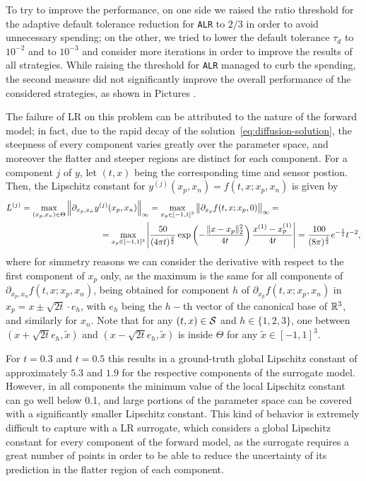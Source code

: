 To try to improve the performance, on one side we raised the ratio threshold for the adaptive default tolerance reduction for \texttt{ALR} to $2/3$ in order to avoid unnecessary spending; on the other, we tried to lower the default tolerance $\tau_d$ to $10^{-2}$ and to $10^{-3}$ and consider more iterations in order to improve the results of all strategies.
While raising the threshold for \texttt{ALR} managed to curb the spending, the second measure did not significantly improve the overall performance of the considered strategies, as shown in Pictures .

The failure of LR on this problem can be attributed to the nature of the forward model; in fact, due to the rapid decay of the solution~\eqref{eq:diffusion-solution}, the steepness of every component varies greatly over the parameter space, and moreover the flatter and steeper regions are distinct for each component.
For a component $j$ of $y$, let $(t,x)$ being the corresponding time and sensor postion.
Then, the Lipschitz constant for $y^{(j)}(x_p,x_n) = f(t,x;x_p,x_n)$ is given by 
\begin{align*}
    L^{(j)} = \max_{(x_p,x_n)\in\Theta}& \left\| \partial_{x_p,  x_n} y^{(j)}(x_p,x_n) \right\|_\infty  =
    \max_{x_p\in[-1,1]^3} \left\| \partial_{x_p} f(t,x;x_p,0) \right\|_\infty  =\\
    &\qquad \qquad= \max_{x_p\in [-1,1]^3} \left| \frac{50}{(4 \pi t)^{\frac{3}{2}}}\exp \left( - \frac{\lVert x-x_p\rVert_2^2}{4t}\right) \frac{x^{(1)}-x_p^{(1)}}{4t} \right| 
    = \frac{100}{(8\pi)^{\frac{3}{2}}} e^{-\frac{1}{2}} t^{-2},
\end{align*}
where for simmetry reasons we can consider the derivative with respect to the first component of $x_p$ only, as the maximum is the same for all components of $\partial_{x_p, x_n} f(t,x;x_p,x_n)$, being obtained for component $h$ of $\partial_{x_p} f(t,x;x_p,x_n)$ in $x_p = x \pm \sqrt{2t} \cdot e_h$, with $e_h$ being the $h-$th vector of the canonical base of $\mathbb{R}^3$, and similarly for $x_n$.
Note that for any $(t,x) \in \mathcal S$ and $h \in \{1,2,3\}$, one between $(x + \sqrt{2t} e_h, \tilde x)$ and $(x - \sqrt{2t} e_h, \tilde x)$ is inside $\Theta$ for any $\tilde x \in [-1,1]^3$.

For $t=0.3$ and $t=0.5$ this results in a ground-truth global Lipschitz constant of approximately $ 5.3$ and $1.9$ for the respective components of the surrogate model.
However, in all components the minimum value of the local Lipschitz constant can go well below 0.1, and large portions of the parameter space can be covered with a significantly smaller Lipschitz constant.
This kind of behavior is extremely difficult to capture with a LR surrogate, which considers a global Lipschitz constant for every component of the forward model, as the surrogate requires a great number of points in order to be able to reduce the uncertainty of its prediction in the flatter region of each component.

